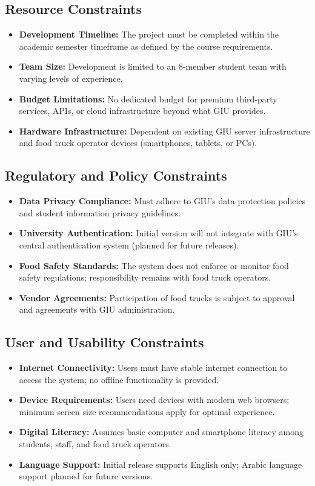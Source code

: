 \documentclass[12pt,a4paper]{article}
\begin{document}
\begin{itemize}[leftmargin=2em, itemsep=6pt]
\subsection{Resource Constraints}
\begin{itemize}[leftmargin=2em, itemsep=8pt]
    \item \textbf{Development Timeline:} The project must be completed within the academic semester timeframe as defined by the course requirements.
    \item \textbf{Team Size:} Development is limited to an 8-member student team with varying levels of experience.
    \item \textbf{Budget Limitations:} No dedicated budget for premium third-party services, APIs, or cloud infrastructure beyond what GIU provides.
    \item \textbf{Hardware Infrastructure:} Dependent on existing GIU server infrastructure and food truck operator devices (smartphones, tablets, or PCs).
\end{itemize}

\subsection{Regulatory and Policy Constraints}
\begin{itemize}[leftmargin=2em, itemsep=8pt]
    \item \textbf{Data Privacy Compliance:} Must adhere to GIU's data protection policies and student information privacy guidelines.
    \item \textbf{University Authentication:} Initial version will not integrate with GIU's central authentication system (planned for future releases).
    \item \textbf{Food Safety Standards:} The system does not enforce or monitor food safety regulations; responsibility remains with food truck operators.
    \item \textbf{Vendor Agreements:} Participation of food trucks is subject to approval and agreements with GIU administration.
\end{itemize}

\subsection{User and Usability Constraints}
\begin{itemize}[leftmargin=2em, itemsep=8pt]
    \item \textbf{Internet Connectivity:} Users must have stable internet connection to access the system; no offline functionality is provided.
    \item \textbf{Device Requirements:} Users need devices with modern web browsers; minimum screen size recommendations apply for optimal experience.
    \item \textbf{Digital Literacy:} Assumes basic computer and smartphone literacy among students, staff, and food truck operators.
    \item \textbf{Language Support:} Initial release supports English only; Arabic language support planned for future versions.
\end{itemize}


\end{itemize}
\end{document}
